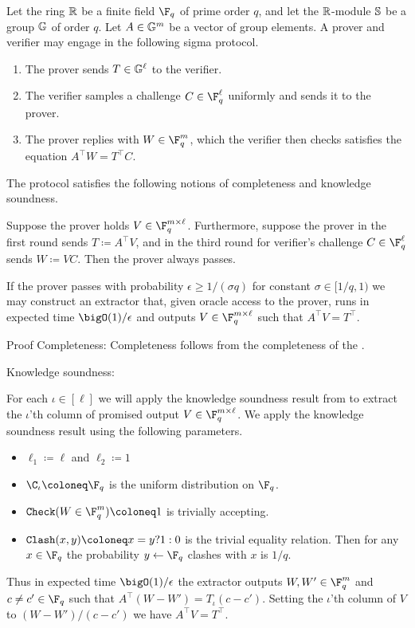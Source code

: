 Let the ring $\R$ be a finite field $\F_q$ of prime order $q$, and let the $\R$-module $\S$ be a group $\G$ of order $q$.
Let $A\in\G^m$ be a vector of group elements.
A prover and verifier may engage in the following sigma protocol.
\begin{enumerate}
    \item
    The prover sends $T\in\G^\ell$ to the verifier.

    \item
    The verifier samples a challenge $C\in\F_q^\ell$ uniformly and sends it to the prover.

    \item
    The prover replies with $W\in\F_q^m$, which the verifier then checks satisfies the equation $A^\intercal W=T^\intercal C$.
\end{enumerate}

The protocol satisfies the following notions of completeness and knowledge soundness.


Suppose the prover holds $V\in\F_q^{m\times\ell}$.
Furthermore, suppose the prover in the first round sends $T\coloneq A^\intercal V$, and in the third round for verifier's challenge $C\in\F_q^\ell$ sends $W\coloneq VC$.
Then the prover always passes.


If the prover passes with probability $\epsilon\geq1/(\sigma q)$ for constant $\sigma\in[1/q,1)$ we may construct an extractor that, given oracle access to the prover, runs in expected time $\bigO(1)/\epsilon$ and outputs $V\in\F_q^{m\times\ell}$ such that $A^\intercal V = T^\intercal$.



Proof
Completeness:
Completeness follows from the completeness of the .


Knowledge soundness:

For each $\iota\in[\ell]$ we will apply the knowledge soundness result from  to extract the $\iota$'th column of promised output $V\in\F_q^{m\times\ell}$.
We apply the knowledge soundness result using the following parameters.
\begin{itemize}
    \item
    $\ell_1\coloneq\ell$ and $\ell_2\coloneq1$

    \item
    $\C_\iota\coloneq\F_q$ is the uniform distribution on $\F_q$.

    \item
    $\Check(W\in\F_q^m)\coloneq1$ is trivially accepting.

    \item
    $\Clash(x,y)\coloneq x=y?1:0$ is the trivial equality relation.
    Then for any $x\in\F_q$ the probability $y\leftarrow\F_q$ clashes with $x$ is $1/q$.
\end{itemize}
Thus in expected time $\bigO(1)/\epsilon$ the extractor outputs $W,W'\in\F_q^m$ and $c\neq c'\in\F_q$ such that $A^\intercal(W-W') = T_\iota(c-c')$.
Setting the $\iota$'th column of $V$ to $(W-W')/(c-c')$ we have $A^\intercal V = T^\intercal$.



